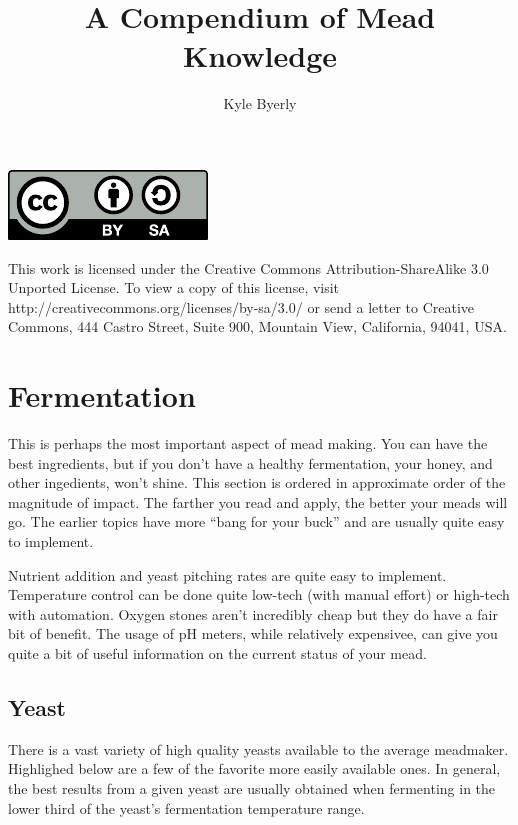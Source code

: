 \documentclass{article}
\title{A Compendium of Mead Knowledge}
\author{
  Kyle Byerly\\
}
\begin{document}
\maketitle
\newpage

\begin{center}
\includegraphics{by-sa.pdf}
\end{center}
This work is licensed under the Creative Commons Attribution-ShareAlike 3.0 Unported License. To view a copy of this license, visit http://creativecommons.org/licenses/by-sa/3.0/ or send a letter to Creative Commons, 444 Castro Street, Suite 900, Mountain View, California, 94041, USA.

\newpage

\tableofcontents
\newpage

\section{Fermentation}
 This is perhaps the most important aspect of mead making. You can have the best ingredients, but if you don't have a healthy fermentation, your honey, and other ingedients,
 won't shine. This section is ordered in approximate order of the magnitude of impact. The farther you read and apply, the better your meads will go. The earlier topics have
 more ``bang for your buck'' and are  usually quite easy to implement. 

 Nutrient addition and yeast pitching rates are quite easy to implement. Temperature control can be done quite low-tech (with manual effort) or high-tech with automation. 
 Oxygen stones aren't incredibly cheap but they do have a fair bit of benefit. The usage of pH meters, while relatively expensivee, can give you quite a bit of useful
 information on the current status of your mead.
 \subsection{Yeast}
  There is a vast variety of high quality yeasts available to the average meadmaker. Highlighed below are a few of the favorite more easily available ones.
  In general, the best results from a given yeast are usually obtained when fermenting in the lower third of the yeast's fermentation temperature range.
\end{document}
